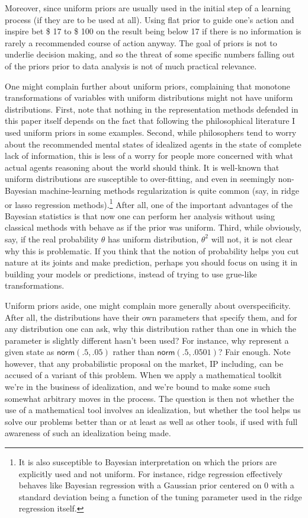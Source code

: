 \documentclass[
  10pt,
  dvipsnames,enabledeprecatedfontcommands]{scrartcl}
\begin{document}
Moreover, since uniform priors are usually used in the initial step of a
learning process (if they are to be used at all). Using flat prior to
guide one's action and inspire bet \$ 17 to \$ 100 on the result being
below 17 if there is no information is rarely a recommended course of
action anyway. The goal of priors is not to underlie decision making,
and so the threat of some specific numbers falling out of the priors
prior to data analysis is not of much practical relevance.

One might complain further about uniform priors, complaining that
monotone transformations of variables with uniform distributions might
not have uniform distributions. First, note that nothing in the
representation methods defended in this paper itself depends on the fact
that following the philosophical literature I used uniform priors in
some examples. Second, while philosophers tend to worry about the
recommended mental states of idealized agents in the state of complete
lack of information, this is less of a worry for people more concerned
with what actual agents reasoning about the world should think. It is
well-known that uniform distributions are susceptible to over-fitting,
and even in seemingly non-Bayesian machine-learning methods
regularization is quite common (say, in ridge or lasso regression
methods).\footnote{It is also susceptible to Bayesian interpretation on which the priors are explicitly used and not uniform. For instance, ridge regression effectively behaves like Bayesian regression with a Gaussian prior centered on 0 with a standard deviation being a function of the tuning parameter used in the ridge regression itself.}
After all, one of the important advantages of the Bayesian statistics is
that now one can perform her analysis without using classical methods
with behave as if the prior was uniform. Third, while obviously, say, if
the real probability \(\theta\) has uniform distribution, \(\theta^2\)
will not, it is not clear why this is problematic. If you think that the
notion of probability helps you cut nature at its joints and make
prediction, perhaps you should focus on using it in building your models
or predictions, instead of trying to use grue-like transformations.

Uniform priors aside, one might complain more generally about
overspecificity. After all, the distributions have their own parameters
that specify them, and for any distribution one can ask, why this
distribution rather than one in which the parameter is slightly
different hasn't been used? For instance, why represent a given state as
\(\mathsf{norm}(.5,.05)\) rather than \(\mathsf{norm}(.5,.0501)\)? Fair
enough. Note however, that any probabilistic proposal on the market, IP
including, can be accused of a variant of this problem. When we apply a
mathematical toolkit we're in the business of idealization, and we're
bound to make some such somewhat arbitrary moves in the process. The
question is then not whether the use of a mathematical tool involves an
idealization, but whether the tool helps us solve our problems better
than or at least as well as other tools, if used with full awareness of
such an idealization being made.
\end{document}
